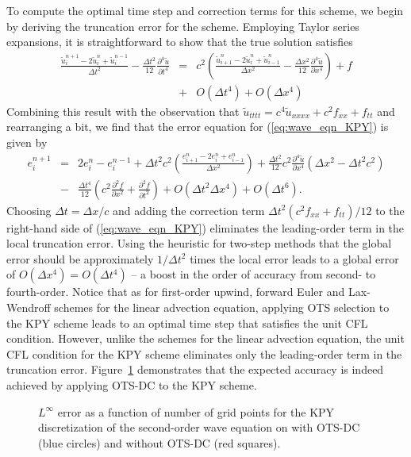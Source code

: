 \documentclass[fleqn,12pt,twoside]{article}
\newcommand{\bea}{\begin{eqnarray}}
\newcommand{\eea}{\end{eqnarray}}
\def\pt{\partial t}
\def\px{\partial x}
\def\tu{\tilde{u}}
\def\dt{\Delta t}
\def\dx{\Delta x}
\begin{document}
To compute the optimal time step and correction terms for this scheme, we
begin by deriving the truncation error for the scheme.  Employing Taylor 
series expansions, it is straightforward to show that the true solution 
satisfies
\bea
  \frac{\tu^{n+1}_i - 2 \tu^n_i + \tu^{n-1}_i}{\dt^2}
    - \frac{\dt^2}{12} \frac{\partial^4 \tu}{\pt^4}
  &=& c^2 \left( \frac{\tu^{n}_{i+1} - 2 \tu^n_i + \tu^n_{i-1}}{\dx^2}
  -\frac{\dx^2}{12} \frac{\partial^4 \tu}{\px^4} \right) + f
  \nonumber \\
  &+& O(\dt^4) + O(\dx^4) 
\eea
Combining this result with the observation that
$\tu_{tttt} = c^4 \tu_{xxxx} + c^2 f_{xx} + f_{tt}$ and rearranging a bit, 
we find that the error equation for (\ref{eq:wave_eqn_KPY}) is given by
\bea
  e^{n+1}_i &=& 2 e^n_i - e^{n-1}_i
  + \dt^2 c^2 \left( \frac{e^{n}_{i+1} - 2 e^n_i + e^n_{i-1}}{\dx^2} \right)
  + \frac{\dt^2}{12} c^2 \frac{\partial^4 \tu}{\px^4} 
    \left( \dx^2 - \dt^2 c^2 \right)
  \nonumber \\
  &-& \frac{\dt^4}{12} \left( c^2 \frac{\partial^2 f}{\px^2} 
                            + \frac{\partial^2 f}{\pt^2} \right)
      + O(\dt^2 \dx^4) + O(\dt^6).
\eea
Choosing $\dt = \dx/c$ and adding the correction term 
$\dt^2 \left(c^2 f_{xx} + f_{tt} \right)/12$ to the right-hand side of 
(\ref{eq:wave_eqn_KPY}) eliminates the leading-order term in the local 
truncation error.  Using the heuristic for two-step methods that the global 
error should be approximately $1/\dt^2$ times the local error leads to a 
global error of $O(\dx^4) = O(\dt^4)$ -- a boost in the order of accuracy 
from second- to fourth-order.  Notice that as for first-order upwind, forward 
Euler and Lax-Wendroff schemes for the linear advection equation, applying OTS 
selection to the KPY scheme leads to an optimal time step that satisfies the 
unit CFL condition.  However, unlike the schemes for the linear advection 
equation, the unit CFL condition for the KPY scheme eliminates only the 
leading-order term in the truncation error.  Figure~\ref{fig:wave_eqn_1d_error} 
demonstrates that the expected accuracy is indeed achieved by applying 
OTS-DC to the KPY scheme.  
\begin{figure}[tb]
\begin{center}
\caption{$L^\infty$ error as a function of number of grid points for the
  KPY discretization of the second-order wave equation on with OTS-DC 
  (blue circles) and without OTS-DC (red squares).
}
\label{fig:wave_eqn_1d_error}
\end{center}
\end{figure}
\end{document}
